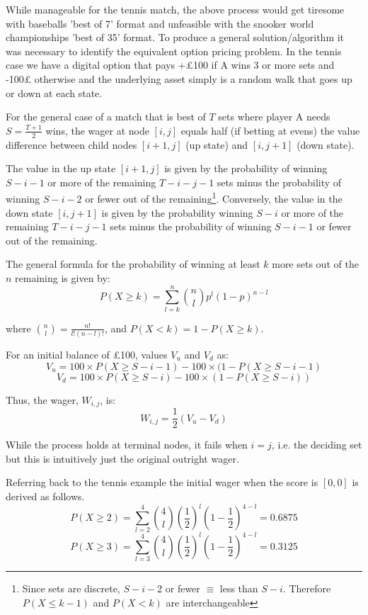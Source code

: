 \documentclass{article}
\begin{document}
While manageable for the tennis match, the above process would get tiresome with baseballs 'best of 7' format and unfeasible with the snooker world championships 'best of 35' format. To produce a general solution/algorithm it was necessary to identify the equivalent option pricing problem. In the tennis case we have a digital option that pays +£100 if A wins 3 or more sets and -100£ otherwise and the underlying asset simply is a random walk that goes up or down at each state. 

For the general case of a match that is best of $T$ sets where player A needs $S = \frac{T+1}{2}$ wins, the wager at node $[i,j]$ equals half (if betting at evens) the value difference between child nodes $[i+1,j]$ (up state) and $[i,j+1]$ (down state). 

The value in the up state $[i+1,j]$ is given by the probability of winning $S-i-1$ or more of the remaining $T-i-j-1$ sets minus the probability of winning $S-i-2$ or fewer out of the remaining\footnote{Since sets are discrete, $S-i-2$ or fewer $\equiv$ less than $S-i$. Therefore $P(X\leq k-1)$ and $P(X < k)$ are interchangeable}. Conversely, the value in the down state $[i,j+1]$ is given by the probability winning $S-i$ or more of the remaining $T-i-j-1$ sets minus the probability of winning $S-i-1$ or fewer out of the remaining.

The general formula for the probability of winning at least $k$ more sets out of the $n$ remaining is given by: 
\[
P(X \geq k) = \sum_{l=k}^{n} \binom{n}{l} p^l (1-p)^{n-l}
\]

where $\binom{n}{l} = \frac{n!}{l!(n-l)!}$, and $P(X < k) = 1 - P(X\geq k)$.

For an initial balance of £100, values $V_u$ and $V_d$ as: 
\[V_u = 100 \times P(X \geq S-i-1) - 100 \times(1-P(X \geq S -i-1) \]
\[V_d = 100 \times P(X \geq S-i) - 100\times(1-P(X \geq S -i)) \]

Thus, the wager, $W_{i,j}$, is: \[ W_{i,j} = \frac{1}{2}(V_u - V_d) \]

While the process holds at terminal nodes, it fails when $i=j$, i.e. the deciding set but this is intuitively just the original outright wager. 

Referring back to the tennis example the initial wager when the score is $[0,0]$ is derived as follows. 
\[ P(X \geq 2) = \sum_{l=2}^{4}\binom{4}{l}\left(\frac{1}{2}\right)^{l}\left(1-\frac{1}{2}\right)^{4-l} = 0.6875\]
\[ P(X \geq 3) = \sum_{l=3}^{4}\binom{4}{l}\left(\frac{1}{2}\right)^{l}\left(1-\frac{1}{2}\right)^{4-l} = 0.3125\]
\end{document}
